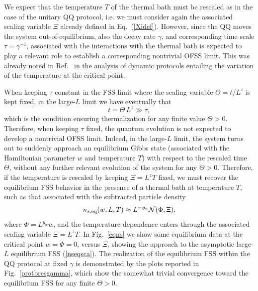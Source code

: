 We expect that the temperature $T$ of the thermal bath must be
rescaled as in the case of the unitary QQ protocol, i.e. we must
consider again the associated scaling variable $\Xi$ already defined
in Eq.~(\ref{Xidef}).  However, since the QQ moves the system
out-of-equilibrium, also the decay rate $\gamma$, and corresponding
time scale $\tau=\gamma^{-1}$, associated with the interactions with
the thermal bath is expected to play a relevant role to establish a
corresponding nontrivial OFSS limit.  This was already noted in
Ref.~\cite{BD-23} in the analysis of dynamic protocols entailing the
variation of the temperature at the critical point.

When keeping $\tau$ constant in the FSS limit where the
scaling variable $\Theta=t/L^z$ is kept fixed, in the large-$L$ limit
we have eventually that
\begin{equation}
  t = \Theta \, L^z \gg \tau,
  \label{tggtau}
  \end{equation}
which is the condition ensuring thermalization for any finite value
$\Theta>0$. Therefore, when keeping $\tau$ fixed, the quantum
evolution is not expected to develop a nontrivial OFSS limit. Indeed,
in the large-$L$ limit, the system turns out to suddenly approach an
equilibrium Gibbs state (associated with the Hamiltonian parameter $w$
and temperature $T$) with respect to the rescaled time $\Theta$,
without any further relevant evolution of the system for any
$\Theta>0$.  Therefore, if the temperature is rescaled by keeping
$\Xi=L^z T$ fixed, we must recover the equilibrium FSS behavior in the
presence of a thermal bath at temperature $T$, such as that associated
with the subtracted particle density~\cite{CPV-14,RV-21}
\begin{equation}
  n_{s,{\rm eq}}(w,L,T) \approx L^{-y_n} {\cal N}(\Phi,\Xi),
  \label{nseqsca}
  \end{equation}
where $\Phi=L^{y_w} w$, and the temperature dependence enters through
the associated scaling variable $\Xi=L^z T$.  In Fig.~\ref{eqns} we
show some equilibrium data at the critical point $w=\Phi=0$, versus
$\Xi$, showing the approach to the asymptotic large-$L$ equilibrium
FSS (\ref{nseqsca}).  The realization of the equilibrium FSS within
the QQ protocol at fixed $\gamma$ is demonstrated by the plots
reported in Fig.~\ref{protbresgamma}, which show the somewhat trivial
convergence toward the equilibrium FSS for any finite $\Theta>0$.

